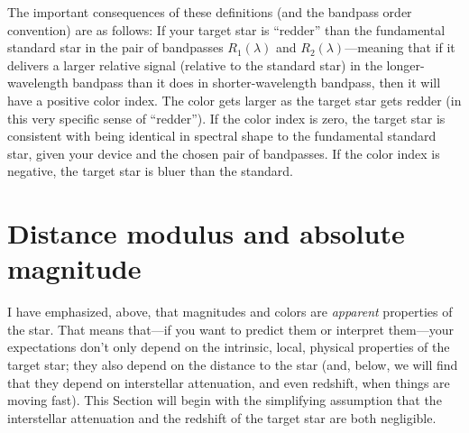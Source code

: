 \documentclass[10pt]{article}
\newcommand{\sectionname}{Section}
\begin{document}
The important consequences of these definitions (and the bandpass order convention) are as follows:
If your target star is ``redder'' than the fundamental standard star in the pair of bandpasses $R_1(\lambda)$ and $R_2(\lambda)$---meaning that if it delivers a larger relative signal (relative to the standard star) in the longer-wavelength bandpass than it does in shorter-wavelength bandpass, then it will have a positive color index.
The color gets larger as the target star gets redder (in this very specific sense of ``redder'').
If the color index is zero, the target star is consistent with being identical in spectral shape to the fundamental standard star, given your device and the chosen pair of bandpasses.
If the color index is negative, the target star is bluer than the standard.

\section{Distance modulus and absolute magnitude}

I have emphasized, above, that magnitudes and colors are \emph{apparent} properties of the star.
That means that---if you want to predict them or interpret them---your expectations don't only depend on the intrinsic, local, physical properties of the target star;
they also depend on the distance to the star (and, below, we will find that they depend on interstellar attenuation, and even redshift, when things are moving fast).
This \sectionname{} will begin with the simplifying assumption that the interstellar attenuation and the redshift of the target star are both negligible.
\end{document}
